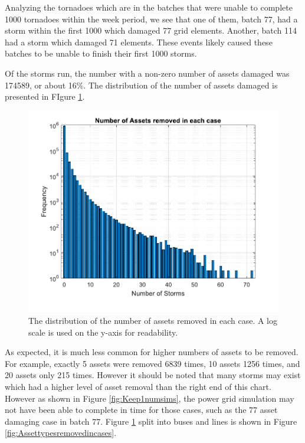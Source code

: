 \documentclass[12pt]{article}
\begin{document}
Analyzing the tornadoes which are in the batches that were unable to complete 1000 tornadoes within the week period, we see that one of them, batch 77, had a storm within the first 1000 which damaged 77 grid elements. Another, batch 114 had a storm which damaged 71 elements. These events likely caused these batches to be unable to finish their first 1000 storms. \par

Of the storms run, the number with a non-zero number of assets damaged was 174589, or about 16\%. The distribution of the number of assets damaged is presented in FIgure \ref{fig:Assetsremovedincases}. 

\begin{figure}[H]
    \centering %
    \includegraphics[scale = 0.6]{Assetsremovedincases.pdf}
    \caption[Distribution of assets removed in each case]{The distribution of the number of assets removed in each case. A log scale is used on the y-axis for readability.}
    \label{fig:Assetsremovedincases}
\end{figure}
As expected, it is much less common for higher numbers of assets to be removed. For example, exactly 5 assets were removed 6839 times, 10 assets 1256 times, and 20 assets only 215 times. However it should be noted that many storms may exist which had a higher level of asset removal than the right end of this chart. However as shown in Figure \ref{fig:Keep1numsims}, the power grid simulation may not have been able to complete in time for those cases, such as the 77 asset damaging case in batch 77. Figure \ref{fig:Assetsremovedincases} split into buses and lines is shown in Figure \ref{fig:Assettypesremovedincases}.
\end{document}
